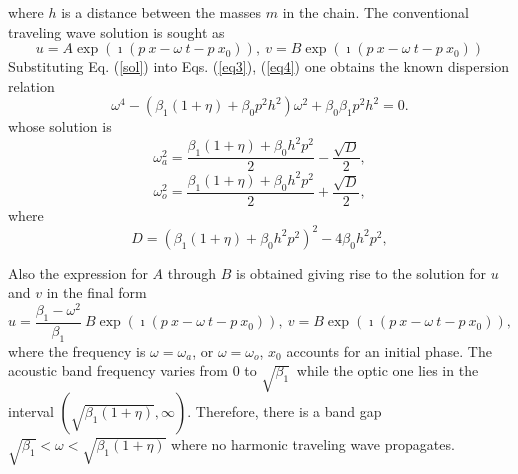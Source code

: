 where $h$ is a distance between the masses $m$ in the chain. 
The conventional traveling wave solution is sought as 
\begin{equation}\label{sol}
 u=A\exp (\imath(p~ x - \omega~ t- p~ x_0)), ~
   v=B \exp (\imath(p~ x - \omega~ t-p~ x_0))
\end{equation}
Substituting Eq. (\ref{sol}) into Eqs. (\ref{eq3}), (\ref{eq4}) one obtains the known dispersion relation \cite{Huang2010} 
\[
\omega^4 -(\beta_1(1+\eta)+\beta_0 p^2 h^2)\omega^2+\beta_0 \beta_1 p^2 h^2=0.
\]
whose solution is 
\begin{equation}\label{acdiscr}
\omega_a^2=\frac{\beta_1(1+\eta)+\beta_0 h^2 p^2}{2}-\frac{\sqrt{D}}{2},
\end{equation}
\begin{equation}\label{optdiscr}
\omega_o^2=\frac{\beta_1(1+\eta)+\beta_0 h^2 p^2}{2}+\frac{\sqrt{D}}{2},
\end{equation}
where
\[
D=(\beta_1(1+\eta)+\beta_0 h^2 p^2)^2-4\beta_0 h^2 p^2,
\]

Also the expression for $A$ through  $B$ is obtained giving rise to the solution for $u$ and $v$ in the final form
\begin{equation}\label{solfin}
 u=\frac{\beta_1-\omega^2}{\beta_1}~B\exp (\imath(p~ x - \omega~ t- p~ x_0)), ~
   v=B \exp (\imath(p~ x - \omega~ t- p~ x_0)),
\end{equation}
where the frequency is  $\omega=\omega_a$,  or $\omega=\omega_o$, $x_0$ accounts for an initial phase.
The acoustic band frequency varies from $0$ to $\sqrt{\beta_1}$\, while the optic one lies in the interval 
$(\sqrt{\beta_1(1+\eta)}, \infty)$. Therefore, there is a band gap $\sqrt{\beta_1}<\omega<\sqrt{\beta_1(1+\eta)}$ where no harmonic traveling wave propagates.

